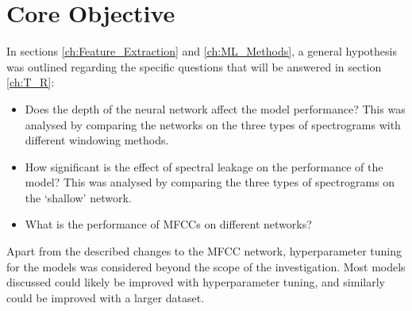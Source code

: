 % 
% 
% 
\section{Core Objective \label{ch:Objective}}
\vspace{0.5cm}

In sections \ref{ch:Feature_Extraction} and \ref{ch:ML_Methods}, a general hypothesis was outlined regarding the specific questions that will be answered in section \ref{ch:T_R}:

\begin{itemize}
    \item Does the depth of the neural network affect the model performance? This was analysed by comparing the networks on the three types of spectrograms with different windowing methods.
    \item How significant is the effect of spectral leakage on the performance of the model? This was analysed by comparing the three types of spectrograms on the `shallow' network.
    \item What is the performance of MFCCs on different networks? 
\end{itemize}

Apart from the described changes to the MFCC network, hyperparameter tuning for the models was considered beyond the scope of the investigation. Most models discussed could likely be improved with hyperparameter tuning, and similarly could be improved with a larger dataset.

% 
% 
